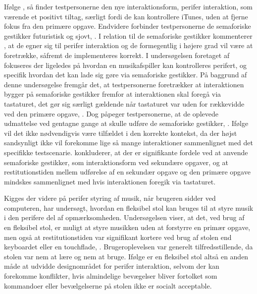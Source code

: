 Ifølge \textcite[ss. 173-174]{PDF:ComparingInputModalities}, så finder testpersonerne den nye interaktionsform, perifer interaktion, som værende et positivt tiltag, særligt fordi de kan kontrollere iTunes, uden at fjerne fokus fra den primære opgave. Endvidere forbinder testpersonerne de semaforiske gestikker futuristisk og sjovt, \parencite[s. 174]{PDF:ComparingInputModalities}. I relation til de semaforiske gestikker kommenterer \textcite[s. 177]{PDF:ComparingInputModalities}, at de egner sig til perifer interaktion og de formegentlig i højere grad vil være at foretrække, såfremt de implementeres korrekt.\blankline
%                    
I undersøgelsen foretaget af \textcite{PDF:AStudyOnTheUseOfSemaphoricGestures} fokuseres der ligeledes på hvordan en musikafspiller kan kontrolleres perifert, og specifik hvordan det kan lade sig gøre via semaforiske gestikker. På baggrund af denne undersøgelse fremgår det, at testpersonerne foretrækker at interaktionen bygger på semaforiske gestikker fremfor at interaktionen skal foregå via tastaturet, det gør sig særligt gældende når tastaturet var uden for rækkevidde ved den primære opgave, \parencite[s. 1963]{PDF:AStudyOnTheUseOfSemaphoricGestures}. Dog påpeger testpersonerne, at de oplevede udmattelse ved gentagne gange at skulle udføre de semaforiske gestikker, \parencite[s. 1963]{PDF:AStudyOnTheUseOfSemaphoricGestures}. Ifølge \textcite[s. 1963]{PDF:AStudyOnTheUseOfSemaphoricGestures} vil det ikke nødvendigvis være tilfældet i den korrekte kontekst, da der højst sandsynligt ikke vil forekomme lige så mange interaktioner sammenlignet med det specifikke testscenarie. \textcite[s. 1964]{PDF:AStudyOnTheUseOfSemaphoricGestures} konkluderer, at der er signifikante fordele ved at anvende semaforiske gestikker, som interaktionsform ved sekundære opgaver, og at restitutionstiden mellem udførelse af en sekundær opgave og den primære opgave mindskes sammenlignet med hvis interaktionen foregik via tastaturet.\blankline
%

Kigges der videre på perifer styring af musik, når brugeren sidder ved computeren, har \textcite[ss. 5-9]{PDF:AChairAsUbiquitousInputDevice} undersøgt, hvordan en fleksibel stol kan bruges til at styre musik i den perifere del af opmærksomheden. Undersøgelsen viser, at det, ved brug af en fleksibel stol, er muligt at styre musikken uden at forstyrre en primær opgave, men også at restitutionstiden var signifikant kortere ved brug af stolen end keyboardet eller en touchflade, \parencite[s. 7]{PDF:AChairAsUbiquitousInputDevice}. Brugeroplevelsen var generelt tilfredsstillende, da stolen var nem at lære og nem at bruge. Ifølge \textcite[s. 8]{PDF:AChairAsUbiquitousInputDevice} er en fleksibel stol altså en anden måde at udvidde designområdet for perifer interaktion, selvom der kan forekomme konflikter, hvis almindelige bevægelser bliver fortolket som kommandoer eller bevælgelserne på stolen ikke er socialt acceptable.

